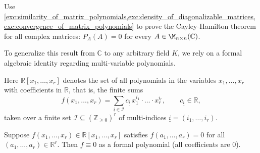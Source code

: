 \begin{exercise}
  \label{exc:cayley_hamilton_via_density}
  Use \cref{exc:similarity_of_matrix_polynomials,exc:density_of_diagonalizable_matrices,exc:convergence_of_matrix_polynomials} to prove the Cayley-Hamilton theorem for all complex matrices: $P_A(A) = 0$ for every $A \in \M_{n \times n}(\mathbb{C})$.
\end{exercise}

To generalize this result from $\mathbb{C}$ to any arbitrary field $K$, we rely on a formal algebraic identity regarding multi-variable polynomials.

Here $\mathbb{R}[x_1, \dots, x_r]$ denotes the set of all polynomials in the variables $x_1, \dots, x_r$ with coefficients in $\mathbb{R}$, that is, the finite sums
\[ f(x_1, \dots, x_r) = \sum_{\underline{i} \in \mathcal{I}} c_{\underline{i}} \, x_1^{i_1} \cdot \dots \cdot x_r^{i_r}, \qquad c_{\underline{i}} \in \mathbb{R}, \]
taken over a finite set $\mathcal{I} \subseteq (\mathbb{Z}_{\ge 0})^r$ of multi-indices $\underline{i} = (i_1, \dots, i_r)$.

\begin{lemma}
  \label{lemma:multi_var_poly}
  Suppose $f(x_1, \dots, x_r) \in \mathbb{R}[x_1, \dots, x_r]$ satisfies $f(a_1, \dots, a_r) = 0$ for all $(a_1, \dots, a_r) \in \mathbb{R}^r$. Then $f \equiv 0$ as a formal polynomial (all coefficients are 0).
\end{lemma}

